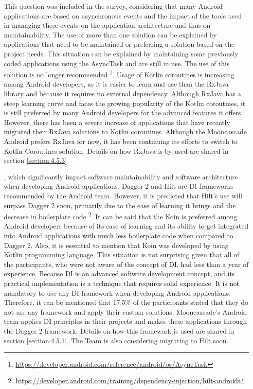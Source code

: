 This question was included in the survey, considering that many Android applications are based on asynchronous events and the impact of the tools used in managing these events on the application architecture and thus on maintainability.
The use of more than one solution can be explained by applications that need to be maintained or preferring a solution based on the project needs. This situation can be explained by maintaining some previously coded applications using the AsyncTask and are still in use. The use of this solution is no longer recommended \footnote{\url{https://developer.android.com/reference/android/os/AsyncTask}}. Usage of Kotlin coroutines is increasing among Android developers, as it is easier to learn and use than the RxJava library and because it requires no external dependency. Although RxJava has a steep learning curve and faces the growing popularity of the Kotlin coroutines, it is still preferred by many Android developers for the advanced features it offers. However, there has been a severe increase of applications that have recently migrated their RxJava solutions to Kotlin coroutines\cite{42}. Although the Mooncascade Android prefers RxJava for now, it has been continuing its efforts to switch to Kotlin Coroutines solution. Details on how RxJava is by used are shared in section \ref{section:4.5.3}

, which significantly impact software maintainability and software architecture when developing Android applications.
Dagger 2 and Hilt are DI frameworks recommended by the Android team. However, it is predicted that Hilt's use will surpass Dagger 2 soon, primarily due to the ease of learning it brings and the decrease in boilerplate code  \footnote{\url{https://developer.android.com/training/dependency-injection/hilt-android}}. It can be said that the Koin is preferred among Android developers because of its ease of learning and its ability to get integrated into Android applications with much less boilerplate code when compared to Dagger 2. Also, it is essential to mention that Koin was developed by using Kotlin programming language. This situation is not surprising given that all of the participants, who were not aware of the concept of DI, had less than a year of experience. Because DI is an advanced software development concept, and its practical implementation is a technique that requires solid experience. It is not mandatory to use any DI framework when developing Android applications. Therefore, it can be mentioned that 17.5\% of the participants stated that they do not use any framework and apply their custom solutions. Mooncascade's Android team applies DI principles in their projects and makes these applications through the Dagger 2 framework. Details on how this framework is used are shared in section \ref{section:4.5.1}. The Team is also considering migrating to Hilt soon.

